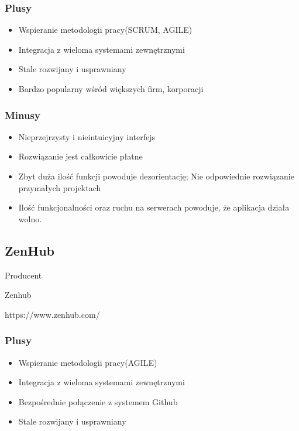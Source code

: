 \documentclass[eng,printmode]{mgr}
\begin{document}
\subsubsection{Plusy}
\begin{itemize}
  \item[--] Wspieranie metodologii pracy(SCRUM, AGILE)
  \item[--] Integracja z wieloma systemami zewnętrznymi
  \item[--] Stale rozwijany i usprawniany
  \item[--] Bardzo popularny wśród większych firm, korporacji
\end{itemize}
\subsubsection{Minusy}
\begin{itemize}
  \item[--] Nieprzejrzysty i nieintuicyjny interfejs
  \item[--] Rozwiązanie jest całkowicie płatne 
  \item[--] Zbyt duża ilość funkcji powoduje dezorientację; Nie odpowiednie rozwiązanie przymałych projektach
  \item[--] Ilość funkcjonalności oraz ruchu na serwerach powoduje, że aplikacja działa wolno.
\end{itemize}

\subsection{ZenHub}
\begin{labeling}{Producent}
\item [Producent:] Zenhub
\item [Link:] https://www.zenhub.com/
\end{labeling}
\subsubsection{Plusy}
\begin{itemize}
  \item[--] Wspieranie metodologii pracy(AGILE)
  \item[--] Integracja z wieloma systemami zewnętrznymi
  \item[--] Bezpośrednie połączenie z systemem Github
  \item[--] Stale rozwijany i usprawniany
\end{itemize}
\end{document}
